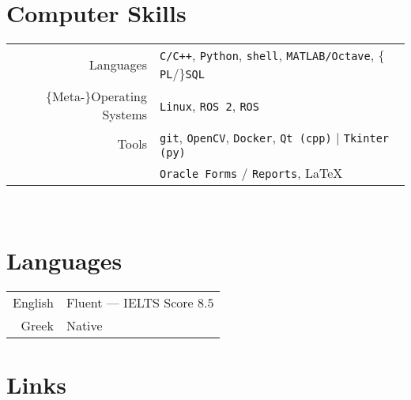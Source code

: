 \documentclass[a4paper,10pt,twoside]{article}
\begin{document}
\section{Computer Skills}

\begin{tabular}{rp{12cm}}
Languages & \texttt{C/C++}, \texttt{Python}, \texttt{shell}, \texttt{MATLAB/Octave}, $\{$\texttt{PL}/$\}$\texttt{SQL}\\
$\{$Meta-$\}$Operating Systems & \texttt{Linux}, \texttt{ROS 2}, \texttt{ROS} \\
Tools & \texttt{git}, \texttt{OpenCV}, \texttt{Docker}, \texttt{Qt (cpp)} | \texttt{Tkinter (py)}\\
      & \texttt{Oracle Forms} / \texttt{Reports}, \LaTeX\\
\end{tabular} \\



\section{Languages}

\begin{tabular}{rp{12cm}}
English & Fluent --- IELTS Score $8.5$ \\
Greek & Native \\
\end{tabular}


\section{Links}
\end{document}
